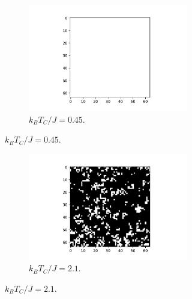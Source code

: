 \documentclass[10 pt, a4paper]{article}
\begin{document}
\begin{figure}[H] 
\begin{subfigure}[b]{0.33\textwidth}
\begin{figure}[H]
\includegraphics[width=\textwidth]{lattice1}
\caption{$k_B T_C / J = 0.45$.}
\end{figure}
\end{subfigure}
\begin{subfigure}[b]{0.33\textwidth}
\begin{figure}[H]
\includegraphics[width=\textwidth]{lattice2}
\caption{$k_B T_C / J = 2.1$.}
\end{figure}
\end{subfigure}
\begin{subfigure}[b]{0.33\textwidth}
\begin{figure}[H] 

\end{figure}
\end{subfigure}
\end{figure}
\end{document}
